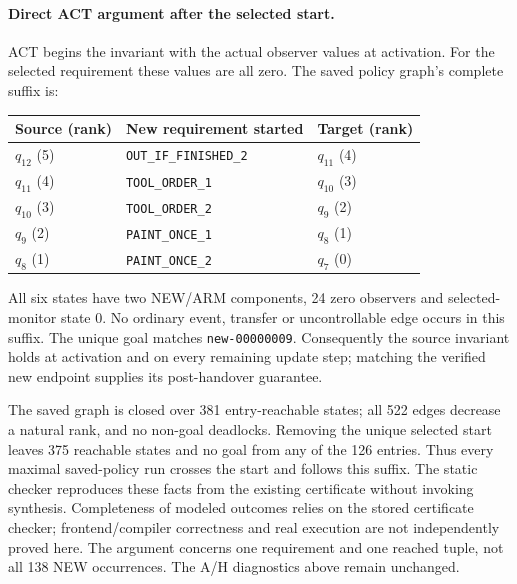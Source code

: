 \paragraph{Direct ACT argument after the selected start.}
ACT begins the invariant with the actual observer values at activation. For the selected requirement these values are all zero. The saved policy graph's complete suffix is:
\begin{center}\small
\begin{tabular}{@{}lll@{}}\toprule
Source (rank) & New requirement started & Target (rank)\\\midrule
$q_{12}$ (5) & \texttt{OUT\_IF\_FINISHED\_2} & $q_{11}$ (4)\\
$q_{11}$ (4) & \texttt{TOOL\_ORDER\_1} & $q_{10}$ (3)\\
$q_{10}$ (3) & \texttt{TOOL\_ORDER\_2} & $q_9$ (2)\\
$q_9$ (2) & \texttt{PAINT\_ONCE\_1} & $q_8$ (1)\\
$q_8$ (1) & \texttt{PAINT\_ONCE\_2} & $q_7$ (0)\\\bottomrule
\end{tabular}
\end{center}
All six states have two NEW/ARM components, 24 zero observers and selected-monitor state 0. No ordinary event, transfer or uncontrollable edge occurs in this suffix. The unique goal matches \texttt{new-00000009}. Consequently the source invariant holds at activation and on every remaining update step; matching the verified new endpoint supplies its post-handover guarantee.

The saved graph is closed over 381 entry-reachable states; all 522 edges decrease a natural rank, and no non-goal deadlocks. Removing the unique selected start leaves 375 reachable states and no goal from any of the 126 entries. Thus every maximal saved-policy run crosses the start and follows this suffix. The static checker  reproduces these facts from the existing certificate without invoking synthesis. Completeness of modeled outcomes relies on the stored certificate checker; frontend/compiler correctness and real execution are not independently proved here. The argument concerns one requirement and one reached tuple, not all 138 NEW occurrences. The A/H diagnostics above remain unchanged.
